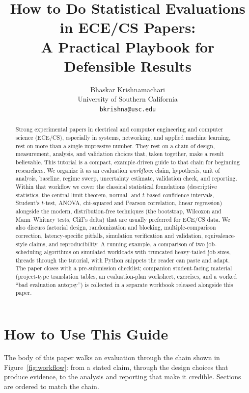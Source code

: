 \documentclass[11pt]{article}
\title{\textbf{How to Do Statistical Evaluations in ECE/CS Papers:\\
A Practical Playbook for Defensible Results}}
\author{Bhaskar Krishnamachari\\
University of Southern California\\
\texttt{bkrishna@usc.edu}}
\date{}
\begin{document}
\maketitle

\begin{abstract}
Strong experimental papers in electrical and computer engineering and computer science (ECE/CS), especially in systems, networking, and applied machine learning, rest on more than a single impressive number. They rest on a chain of design, measurement, analysis, and validation choices that, taken together, make a result believable. This tutorial is a compact, example-driven guide to that chain for beginning researchers. We organize it as an evaluation \emph{workflow}: claim, hypothesis, unit of analysis, baseline, regime sweep, uncertainty estimate, validation check, and reporting. Within that workflow we cover the classical statistical foundations (descriptive statistics, the central limit theorem, normal- and $t$-based confidence intervals, Student's $t$-test, ANOVA, chi-squared and Pearson correlation, linear regression) alongside the modern, distribution-free techniques (the bootstrap, Wilcoxon and Mann--Whitney tests, Cliff's delta) that are usually preferred for ECE/CS data. We also discuss factorial design, randomization and blocking, multiple-comparison correction, latency-specific pitfalls, simulation verification and validation, equivalence-style claims, and reproducibility. A running example, a comparison of two job-scheduling algorithms on simulated workloads with truncated heavy-tailed job sizes, threads through the tutorial, with Python snippets the reader can paste and adapt. The paper closes with a pre-submission checklist; companion student-facing material (project-type translation tables, an evaluation-plan worksheet, exercises, and a worked ``bad evaluation autopsy'') is collected in a separate workbook released alongside this paper.
\end{abstract}

\section*{How to Use This Guide}
\label{sec:how-to-use}

The body of this paper walks an evaluation through the chain shown in Figure~\ref{fig:workflow}: from a stated claim, through the design choices that produce evidence, to the analysis and reporting that make it credible. Sections are ordered to match the chain.
\end{document}
